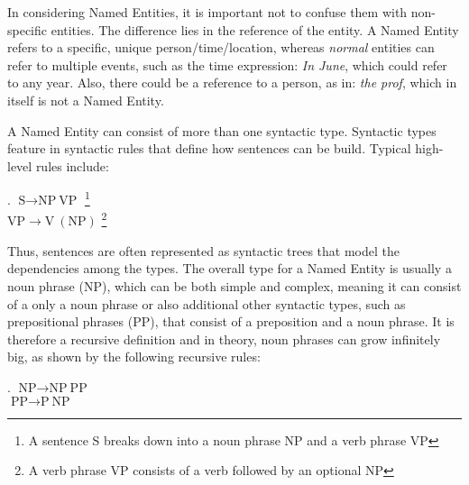 \documentclass[11pt]{article}
\newcommand{\namedentity}{Named Entity}
\begin{document}
In considering Named Entities, it is important not to confuse them with non-specific entities. %
The difference lies in the reference of the entity. A Named Entity refers to a specific, unique person/time/location, whereas
\emph{normal} entities can refer to multiple events, such as the time expression: \emph{In June}, which could refer to any year.
Also, there could be a reference to a person, as in: \emph{the prof}, which in itself is not a \namedentity.

A Named Entity  can consist of more than one syntactic type. Syntactic types feature in syntactic rules that define how sentences can be build.
Typical high-level rules include:

\ex. $\text{S} \rightarrow \text{NP}\  \text{VP} $ \footnote{ A sentence S breaks down into a noun phrase NP and a verb phrase VP} \\
$ \text{VP} \rightarrow \text{V}\  (\text{NP})$ \footnote{ A verb phrase VP consists of a verb followed by an optional NP} 

Thus, sentences are often represented as syntactic trees that model the dependencies among the types.
The overall type for a Named Entity is usually a noun phrase (NP), which can be both simple and complex, meaning it can consist of a only a noun phrase or 
also additional other syntactic types, such as prepositional phrases (PP), that consist of a preposition and a noun phrase. 
It is therefore a recursive definition and in theory, noun phrases can grow infinitely big, as shown by the following recursive rules:  %

\ex. $ \text{NP} \rightarrow \text{NP} \  \text{PP}$ \\
     $ \text{PP} \rightarrow \text{P} \  \text{NP}$ 
 

% 
\end{document}
